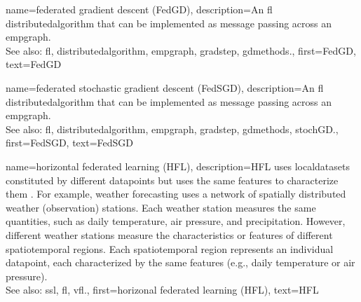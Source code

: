 {name={federated gradient descent (FedGD)},
	description={An \gls{fl} \gls{distributedalgorithm} that 
		can be implemented as message passing across an \gls{empgraph}. 
		\\ 
		See also: \gls{fl}, \gls{distributedalgorithm}, \gls{empgraph}, \gls{gradstep}, \gls{gdmethods}.},
	first={FedGD},
	text={FedGD}
} 

{name={federated stochastic gradient descent (FedSGD)},
	description={An \gls{fl} \gls{distributedalgorithm} that 
		can be implemented as message passing across an \gls{empgraph}. 
		\\ 
		See also: \gls{fl}, \gls{distributedalgorithm}, \gls{empgraph}, \gls{gradstep}, \gls{gdmethods}, \gls{stochGD}.},
	first={FedSGD},
	text={FedSGD}
} 

{name={horizontal federated learning (HFL)},
	description={HFL uses \glspl{localdataset} constitut\-ed by different
	   	\glspl{datapoint} but uses the same \glspl{feature} to characterize them \cite{HFLChapter2020}.
		For example, weather forecasting uses a network of spatially distributed
		weather (observation) stations. Each weather station measures the
		same quantities, such as daily temperature, air pressure, and precipitation.
		However, different weather stations measure the characteristics or
		\glspl{feature} of different spatiotemporal regions. Each spatiotemporal region 
		represents an individual \gls{datapoint}, each characterized by the same \glspl{feature} 
		(e.g., daily temperature or air pressure).\\
		See also: \gls{ssl}, \gls{fl}, \gls{vfl}.},
	first={horizonal federated learning (HFL)},
	text={HFL}
} 

